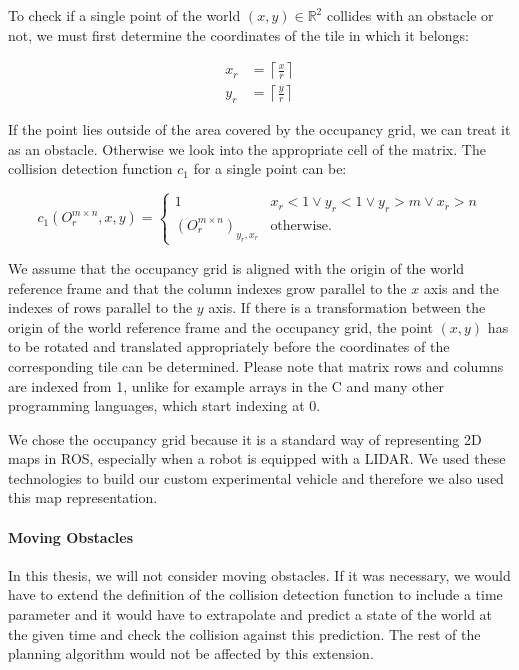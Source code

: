 To check if a single point of the world $\left(x,y\right)\in \mathbb{R}^2$ collides with an obstacle or not, we must first determine the coordinates of the tile in which it belongs:

\begin{equation*}
\begin{aligned}
	x_r &= \left\lceil \frac{x}{r} \right\rceil \\
	y_r &= \left\lceil \frac{y}{r} \right\rceil
\end{aligned}
\end{equation*}

If the point lies outside of the area covered by the occupancy grid, we can treat it as an obstacle. Otherwise we look into the appropriate cell of the matrix. The collision detection function $c_1$ for a single point can be:

\begin{equation*}
	c_1(O_{r}^{m\times n}, x, y) =
	\begin{cases}
		1 & x_r < 1 \lor y_r < 1 \lor y_r > m \lor x_r > n \\
		\left(O_{r}^{m\times n}\right)_{y_r, x_r} & \text{otherwise}.
	\end{cases}
\end{equation*}

We assume that the occupancy grid is aligned with the origin of the world reference frame and that the column indexes grow parallel to the $x$ axis and the indexes of rows parallel to the $y$ axis. If there is a transformation between the origin of the world reference frame and the occupancy grid, the point $(x, y)$ has to be rotated and translated appropriately before the coordinates of the corresponding tile can be determined. Please note that matrix rows and columns are indexed from 1, unlike for example arrays in the C and many other programming languages, which start indexing at 0.

We chose the occupancy grid because it is a standard way of representing 2D maps in \gls{ROS}, especially when a robot is equipped with a \gls{LIDAR}. We used these technologies to build our custom experimental vehicle and therefore we also used this map representation.

\paragraph{Moving Obstacles}
In this thesis, we will not consider moving obstacles. If it was necessary, we would have to extend the definition of the collision detection function to include a time parameter and it would have to extrapolate and predict a state of the world at the given time and check the collision against this prediction. The rest of the planning algorithm would not be affected by this extension.

